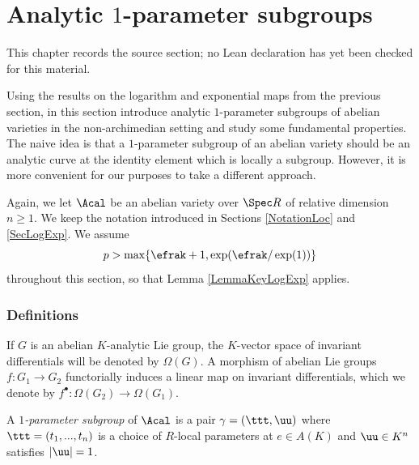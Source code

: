 \chapter{Analytic $1$-parameter subgroups}
\label{chabauty-coleman-bound-surfaces-chapter-08}

\begin{remark}
\label{chabauty-coleman-bound-surfaces-chapter-08-source}
This chapter records the source section; no Lean declaration has yet been checked for this material.
\notready
\end{remark}

\label{Sec1PS}

Using the results on the logarithm and exponential maps from the previous section, in this section introduce analytic $1$-parameter subgroups of abelian varieties in the non-archimedian setting and study some fundamental properties. The naive idea is that a $1$-parameter subgroup of an abelian variety should be an analytic curve at the identity element which is locally a subgroup. However, it is more convenient for our purposes to take a different approach.

Again, we let $\Acal$ be an abelian variety over $\Spec R$ of relative dimension $n\ge 1$. We keep the notation introduced in Sections \ref{NotationLoc} and  \ref{SecLogExp}. We assume
$$
p>\max\{\efrak +1 , \exp(\efrak/\exp(1))\}
$$
throughout this section, so that Lemma \ref{LemmaKeyLogExp} applies.

\subsection{Definitions} If $G$ is an abelian $K$-analytic Lie group, the $K$-vector space of invariant differentials will be denoted by $\Omega(G)$. A morphism of abelian Lie groups $f:G_1\to G_2$ functorially induces a linear map on invariant differentials, which we denote by $f^\bullet:\Omega(G_2)\to \Omega(G_1)$.


A \emph{$1$-parameter subgroup} of $\Acal$ is a pair $\gamma=(\ttt,\uu)$ where $\ttt=(t_1,...,t_n)$ is a choice of $R$-local parameters at $e\in A(K)$ and $\uu\in K^n$ satisfies $|\uu|=1$.


